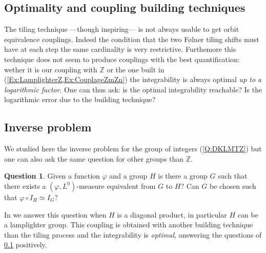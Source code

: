 \documentclass[english, 11pt, a4paper]{article}
\theoremstyle{definition}
\newtheorem{Q}[Def]{Question}
\numberwithin{equation}{section}
\newcommand{\bZ}{\mathbb{Z}}
\begin{document}
\subsection{Optimality and coupling building techniques}\label{subsec:Optim}

The tiling technique —though inspiring— is not always usable to get orbit
equivalence couplings. Indeed the condition that the two Følner tiling shifts
must have at each step the same cardinality is very restrictive. Furthemore this
technique does not seem to produce couplings with the best quantification: wether
it is our coupling with $\bZ$ or the one built in \cite{DKLMT}
(\cref{Ex:LamplighterZ,Ex:CouplageZmZn}) the integrability is always optimal
\emph{up to a logarithmic factor}.
One can thus ask: is the optimal integrability reachable? Is the logarithmic
error due to the building technique?

\subsection{Inverse problem}

We studied here the inverse problem for the group of integers
(\cref{Q:DKLMTZ}) but one can also ask the same question for other groups
than $\bZ$.

\begin{Q}\label{Q:InversePbGen}
  Given a function $\varphi$ and a group $H$ 
  is there a group $G$ such that there exists a $(\varphi,L^0)$-measure
  equivalent from $G$ to $H$? Can $G$ be chosen such that $\varphi\circ I_H
  \simeq I_G$?
\end{Q}

In \cite{EscSofic} we answer this question when $H$ is a diagonal
product, in particular $H$ can be a lamplighter group. This coupling is
obtained with another building technique than the tiling process and the
integrability is \emph{optimal}, answering the questions of
\cref{subsec:Optim} positively.

\newpage


\newpage
\end{document}
